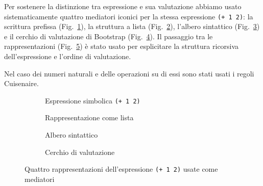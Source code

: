 \documentclass[withtimes]{easychair}
\begin{document}
Per sostenere la distinzione tra espressione e sua valutazione abbiamo usato sistematicamente quattro mediatori iconici per la stessa espressione \texttt{(+ 1 2)}: la scrittura prefissa (Fig.~\ref{fig:s-exp}), la struttura a lista (Fig.~\ref{fig:lista}), l'albero sintattico (Fig.~\ref{fig:albero}) e il cerchio di valutazione di Bootstrap (Fig.~\ref{fig:cerchio}). Il passaggio tra le rappresentazioni (Fig.~\ref{fig:mediatori-iconici}) è stato usato per esplicitare la struttura ricorsiva dell'espressione e l'ordine di valutazione.

Nel caso dei numeri naturali e delle operazioni su di essi sono stati usati i regoli Cuisenaire.

\begin{figure}[!htb]
    \centering
    \captionsetup[subfigure]{justification=centering,singlelinecheck=false}

    \begin{subfigure}[t]{0.4\textwidth}
      \centering
      \begin{minipage}[c][0.13\textheight][c]{\linewidth}
        \centering
        
      \end{minipage}
      \caption{Espressione simbolica \texttt{(+ 1 2)}\label{fig:s-exp}}
    \end{subfigure}
%
    \begin{subfigure}[t]{0.4\textwidth}
      \centering
      \begin{minipage}[c][0.13\textheight][c]{\linewidth}
        \centering
        
      \end{minipage}
      \caption{Rappresentazione come lista\label{fig:lista}}
    \end{subfigure}\hfill

    \vspace{0.8em}

    \begin{subfigure}[t]{0.4\textwidth}
      \centering
      \begin{minipage}[c][0.13\textheight][c]{\linewidth}
        \centering
        
      \end{minipage}
      \caption{Albero sintattico\label{fig:albero}}
    \end{subfigure}
%
    \begin{subfigure}[t]{0.4\textwidth}
      \centering
      \begin{minipage}[c][0.13\textheight][c]{\linewidth}
        \centering
        
      \end{minipage}
      \caption{Cerchio di valutazione\label{fig:cerchio}}
    \end{subfigure}\hfill

  \caption{Quattro rappresentazioni dell'espressione \texttt{(+ 1 2)} usate come mediatori}
  \label{fig:mediatori-iconici}
\end{figure}
\end{document}
